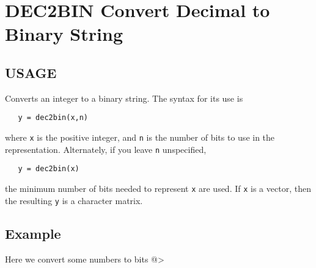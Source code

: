 \section{DEC2BIN Convert Decimal to Binary String}

\subsection{USAGE}

Converts an integer to a binary string.  The syntax for its
use is
\begin{verbatim}
   y = dec2bin(x,n)
\end{verbatim}
where \verb|x| is the positive integer, and \verb|n| is the number of
bits to use in the representation.  Alternately, if you leave
\verb|n| unspecified, 
\begin{verbatim}
   y = dec2bin(x)
\end{verbatim}
the minimum number of bits needed to represent \verb|x| are used.
If \verb|x| is a vector, then the resulting \verb|y| is a character
matrix.
\subsection{Example}

Here we convert some numbers to bits
@>
